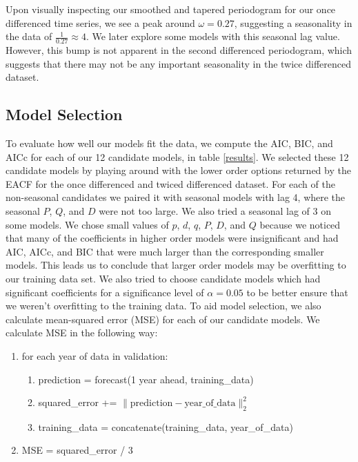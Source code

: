 \documentclass[11pt]{paper}
\begin{document}
Upon visually inspecting our smoothed and tapered periodogram for our once differenced time series, we see a peak around $\omega = 0.27$, suggesting a seasonality in the data of $\frac{1}{0.27} \approx 4$. We later explore some models with this seasonal lag value. However, this bump is not apparent in the second differenced periodogram, which suggests that there may not be any important seasonality in the twice differenced dataset.

\subsection{Model Selection}
To evaluate how well our models fit the data, we compute the AIC, BIC, and AICc for each of our 12 candidate models, in table \ref{results}. We selected these 12 candidate models by playing around with the lower order options returned by the EACF for the once differenced and twiced differenced dataset. For each of the non-seasonal candidates we paired it with seasonal models with lag 4, where the seasonal $P$, $Q$, and $D$ were not too large. We also tried a seasonal lag of 3 on some models. We chose small values of $p$, $d$, $q$, $P$, $D$, and $Q$ because we noticed that many of the coefficients in higher order models were insignificant and had AIC, AICc, and BIC that were much larger than the corresponding smaller models. This leads us to conclude that larger order models may be overfitting to our training data set. We also tried to choose candidate models which had significant coefficients for a significance level of $\alpha = 0.05$ to be better ensure that we weren't overfitting to the training data. To aid model selection, we also calculate mean-squared error (MSE) for each of our candidate models. We calculate MSE in the following way:

\begin{algo}
\begin{enumerate}
    \item for each year of data in validation:
    \begin{enumerate}
        \item prediction = forecast(1 year ahead, training_data)
        \item squared_error += $\| \text{prediction} - \text{year_of_data}\|_2^2$
        \item training_data = concatenate(training_data, year_of_data)
    \end{enumerate}
    \item MSE = squared_error / 3
\end{enumerate}
\end{algo}
\end{document}
